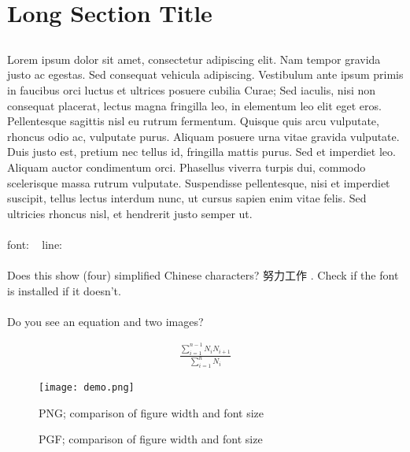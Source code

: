 \documentclass[a4paper,twoside,UTF8]{article}
\begin{document}
	\section[Short Section Title]{Long Section Title}
		\begin{multicols}{2}
		\subsection{}
			\paragraph{}
				Lorem ipsum dolor sit amet, consectetur adipiscing elit. Nam tempor gravida justo ac egestas. Sed consequat vehicula adipiscing. Vestibulum ante ipsum primis in faucibus orci luctus et ultrices posuere cubilia Curae; Sed iaculis, nisi non consequat placerat, lectus magna fringilla leo, in elementum leo elit eget eros. Pellentesque sagittis nisl eu rutrum fermentum. Quisque quis arcu vulputate, rhoncus odio ac, vulputate purus. Aliquam posuere urna vitae gravida vulputate. Duis justo est, pretium nec tellus id, fringilla mattis purus. Sed et imperdiet leo. Aliquam auctor condimentum orci. Phasellus viverra turpis dui, commodo scelerisque massa rutrum vulputate. Suspendisse pellentesque, nisi et imperdiet suscipit, tellus lectus interdum nunc, ut cursus sapien enim vitae felis. Sed ultricies rhoncus nisl, et hendrerit justo semper ut.
			\paragraph{}
				font: \fontname\font\ \the\fontdimen6\font
				line: \prntlen{\textwidth} \prntlen{\linewidth}
			\paragraph{}
				Does this show (four) simplified Chinese characters? 努力工作 . Check if the font is installed if it doesn't.
			\paragraph{}
				Do you see an equation and two images?
		\end{multicols}

		\begin{equation} \begin{split}
			\frac{\sum_{i=1}^{n-1}N_{i}N_{i+1}}{\sum_{i=1}^{n} N_{i}}
			\label{eq:equation_label}
		\end{split} \end{equation}

		\begin{figure}[ht]
			\texttt{[image: demo.png]}
			\caption{PNG; comparison of figure width and font size}
			\label{fig:png_label}
		\end{figure}

		\begin{figure}[ht]
			
			\caption{PGF; comparison of figure width and font size}
			\label{fig:pgf_label}
		\end{figure}
\end{document}
